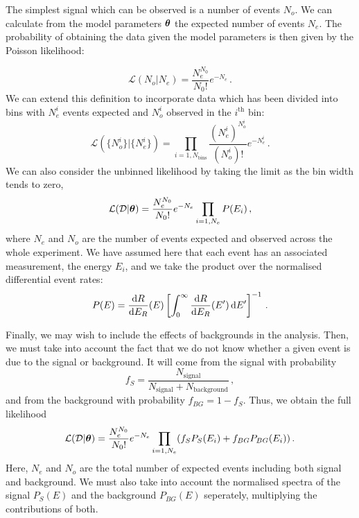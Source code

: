 The simplest signal which can be observed is a number of events $N_o$. We can calculate from the model parameters $\boldsymbol\theta$ the expected number of events $N_e$. The probability of obtaining the data given the model parameters is then given by the Poisson likelihood:

\begin{equation}
\mathcal{L}(N_o|N_e) = \frac{N_e^{N_0}}{N_0!}e^{-N_e}\,.
\end{equation}
We can extend this definition to incorporate data which has been divided into bins with $N_e^{i}$ events expected and $N_o^{i}$ observed in the $i^\textrm{th}$ bin:
\begin{equation}
\label{eq:ParamRecon:binnedL}
\mathcal{L}(\{N_o^{i}\}|\{N_e^{i}\}) = \prod_{i = 1,N_\textrm{bins}} \frac{(N_e^{i})^{N_o^{i}}}{(N_o^{i})!}e^{-N_e^{i}}\,.
\end{equation}
We can also consider the unbinned likelihood by taking the limit as the bin width tends to zero,
\begin{equation}
\label{eq:ParamRecon:unbinnedL}
\mathcal{L}(\mathcal{D}|\boldsymbol\theta) = \frac{N_e^{N_0}}{N_0!}e^{-N_e}\prod_{i = 1,N_e} P(E_i)\,,
\end{equation}
where $N_e$ and $N_o$ are the number of events expected and observed across the whole experiment. We have assumed here that each event has an associated measurement, the energy $E_i$, and we take the product over the normalised differential event rates:
\begin{equation}
P(E) = \frac{\mathrm{d}R}{\mathrm{d}E_R}(E)\left[\int_0^{\infty} \frac{\mathrm{d}R}{\mathrm{d}E_R}(E')\,\mathrm{d}E'\right]^{-1}\,.
\end{equation}

Finally, we may wish to include the effects of backgrounds in the analysis. Then, we must take into account the fact that we do not know whether a given event is due to the signal or background. It will come from the signal with probability
\begin{equation}
f_S = \frac{N_\textrm{signal}}{N_\textrm{signal} + N_\textrm{background}}\,,
\end{equation}
and from the background with probability $f_{BG} = 1-f_S$. Thus, we obtain the full likelihood
\begin{equation}
\mathcal{L}(\mathcal{D}|\boldsymbol\theta) = \frac{N_e^{N_0}}{N_0!}e^{-N_e}\prod_{i = 1,N_e} (f_S P_S(E_i) + f_{BG} P_{BG}(E_i)) \,.
\end{equation}
Here, $N_e$ and $N_o$ are the total number of expected events including both signal and background. We must also take into account the normalised spectra of the signal $P_S(E)$ and the background $P_{BG}(E)$ seperately, multiplying the contributions of both.

